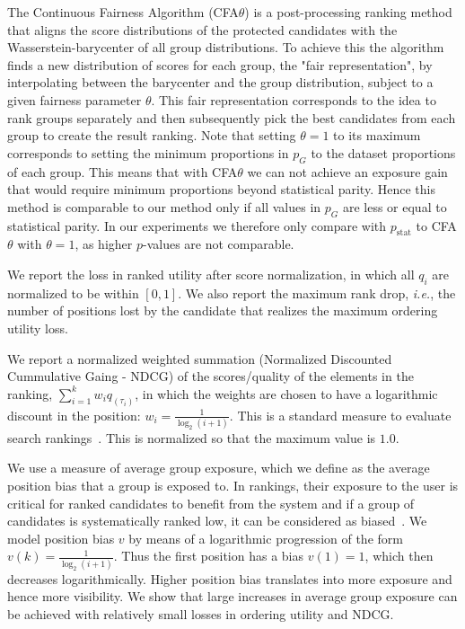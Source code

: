  The Continuous Fairness Algorithm (CFA$\theta$) is a post-processing ranking method that aligns the score distributions of the protected candidates with the Wasserstein-barycenter of all group distributions.
%
To achieve this the algorithm finds a new distribution of scores for each group, the "fair representation", by interpolating between the barycenter and the group distribution, subject to a given fairness parameter $\theta$.
%
This fair representation corresponds to the idea to rank groups separately and then subsequently pick the best candidates from each group to create the result ranking.
%
Note that setting $\theta=1$ to its maximum corresponds to setting the minimum proportions in $p_G$ to the dataset proportions of each group.
%
This means that with CFA$\theta$ we can not achieve an exposure gain that would require minimum proportions beyond statistical parity.
%
Hence this method is comparable to our method only if all values in $p_G$ are less or equal to statistical parity.
%
In our experiments we therefore only compare \algoFAIR with $p_{\text{stat}}$ to CFA$\theta$ with $\theta=1$, as higher $p$-values are not comparable.


 We report the loss in ranked utility after score normalization, in which all $q_i$ are normalized to be within $[0, 1]$.
%
We also report the maximum rank drop, {\em i.e.}, the number of positions lost by the candidate that realizes the maximum ordering utility loss.


%
We report a normalized weighted summation (Normalized Discounted Cummulative Gaing - NDCG) of the scores/quality of the elements in the ranking, $\sum_{i=1}^{k} w_i q_{(\tau_i)}$, in which the weights are chosen to have a logarithmic discount in the position:  $w_i = \frac{1}{\log_2 (i+1)}$. This is a standard measure to evaluate search rankings~\cite{jarvelin2002cumulated}.
This is normalized so that the maximum value is $1.0$.


 We use a measure of average group exposure, which we define as the average position bias that a group is exposed to.
%
In rankings, their exposure to the user is critical for ranked candidates to benefit from the system and if a group of candidates is systematically ranked low, it can be considered as biased~\cite{friedman1996bias}.
%
We model position bias $v$ by means of a logarithmic progression of the form $v(k) = \frac{1}{\log_2(i+1)}$.
%
Thus the first position has a bias $v(1)=1$, which then decreases logarithmically.
%
Higher position bias translates into more exposure and hence more visibility.
%
We show that large increases in average group exposure can be achieved with relatively small losses in ordering utility and NDCG.


